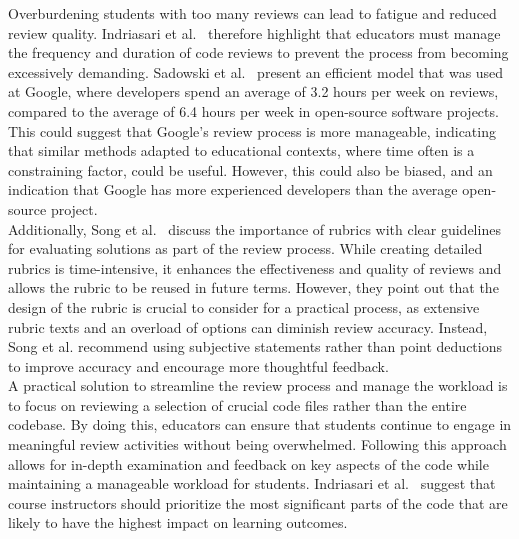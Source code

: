 Overburdening students with too many reviews can lead to fatigue and reduced review quality. Indriasari et al.~\cite{Indriasari_Luxton_2020} therefore highlight that educators must manage the frequency and duration of code reviews to prevent the process from becoming excessively demanding. Sadowski et al.~\cite{sadowski_google} present an efficient model that was used at Google, where developers spend an average of 3.2 hours per week on reviews, compared to the average of 6.4 hours per week in open-source software projects. This could suggest that Google's review process is more manageable, indicating that similar methods adapted to educational contexts, where time often is a constraining factor, could be useful. However, this could also be biased, and an indication that Google has more experienced developers than the average open-source project. \\

Additionally, Song et al.~\cite{Song_Goldstein_Sakr_2020} discuss the importance of rubrics with clear guidelines for evaluating solutions as part of the review process. While creating detailed rubrics is time-intensive, it enhances the effectiveness and quality of reviews and allows the rubric to be reused in future terms. However, they point out that the design of the rubric is crucial to consider for a practical process, as extensive rubric texts and an overload of options can diminish review accuracy. Instead, Song et al. recommend using subjective statements rather than point deductions to improve accuracy and encourage more thoughtful feedback. \\

A practical solution to streamline the review process and manage the workload is to focus on reviewing a selection of crucial code files rather than the entire codebase. By doing this, educators can ensure that students continue to engage in meaningful review activities without being overwhelmed. Following this approach allows for in-depth examination and feedback on key aspects of the code while maintaining a manageable workload for students. Indriasari et al.~\cite{Indriasari_Luxton_2020} suggest that course instructors should prioritize the most significant parts of the code that are likely to have the highest impact on learning outcomes. \\





